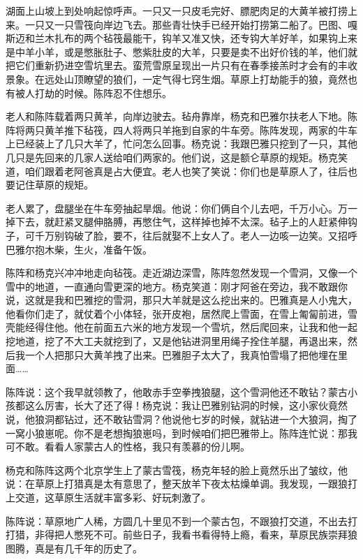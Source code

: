 \par 湖面上山坡上到处响起惊呼声。一只又一只皮毛完好、膘肥肉足的大黄羊被打捞上来。一只又一只雪筏向岸边飞去。那些青壮快手已经开始打捞第二船了。巴图、嘎斯迈和兰木扎布的两个毡筏最能干，钩羊又准又快，还专钩大羊好羊，如果钩上来是中羊小羊，或是憋胀肚子、憋紫肚皮的大羊，只要是卖不出好价钱的羊，他们就把它们重新扔进空雪坑里去。蛮荒雪原呈现出一片只有在春季接羔时才会有的丰收景象。在远处山顶瞭望的狼们，一定气得七窍生烟。草原上打劫能手的狼，竟然也有被人打劫的时候。陈阵忍不住想乐。
\par 老人和陈阵载着两只黄羊，向岸边驶去。毡舟靠岸，杨克和巴雅尔扶老人下地。陈阵将两只黄羊推下毡筏，四人将两只羊拖到自家的牛车旁。陈阵发现，两家的牛车上已经装上了几只大羊了，忙问怎么回事。杨克说：我跟巴雅只挖到了一只，其他几只是先回来的几家人送给咱们两家的。他们说，这是额仑草原的规矩。杨克笑道，咱们跟着老阿爸真是占大便宜。老人也笑了笑说：你们也是草原人了，往后也要记住草原的规矩。
\par 老人累了，盘腿坐在牛车旁抽起旱烟。他说：你们俩自个儿去吧，千万小心。万一掉下去，就赶紧叉腿伸胳膊，再憋住气，这样掉也掉不太深。毡子上的人赶紧伸钩子，可千万别钩破了脸，要不，往后就娶不上女人了。老人一边咳一边笑。又招呼巴雅尔抱木柴，生火，准备午饭。
\par 陈阵和杨克兴冲冲地走向毡筏。走近湖边深雪，陈阵忽然发现一个雪洞，又像一个雪中的地道，一直通向雪更深的地方。杨克笑道：刚才阿爸在旁边，我不敢跟你说，这就是我和巴雅挖的雪洞，那只大羊就是这么挖出来的。巴雅真是人小鬼大，他看你们走了，就仗着个小体轻，张开皮袍，居然爬上雪面，在雪上匍匐前进，雪壳能经得住他。他在前面五六米的地方发现一个雪坑，然后爬回来，让我和他一起挖地道，挖了不大工夫就挖到了，又是他钻进洞里用绳子拴住羊腿，再退出来，然后我一个人把那只大黄羊拽了出来。巴雅胆子太大了，我真怕雪塌了把他埋在里面……
\par 陈阵说：这个我早就领教了，他敢赤手空拳拽狼腿，这个雪洞他还不敢钻？蒙古小孩都这么厉害，长大了还了得！杨克说：我让巴雅别钻洞的时候，这小家伙竟然说，他狼洞都钻过，还不敢钻雪洞？他说他七岁的时候，就钻进一个大狼洞，掏了一窝小狼崽呢。你不是老想掏狼崽吗，到时候咱们把巴雅带上。陈阵连忙说：那我可不敢。看看人家蒙古人的性格，我只有羡慕的份儿啊。
\par 杨克和陈阵这两个北京学生上了蒙古雪筏，杨克年轻的脸上竟然乐出了皱纹，他说：在草原上打猎真是太有意思了，整天放羊下夜太枯燥单调。我发现，一跟狼打上交道，这草原生活就丰富多彩、好玩刺激了。
\par 陈阵说：草原地广人稀，方圆几十里见不到一个蒙古包，不跟狼打交道，不出去打打猎，非得把人憋死不可。前些日子，我看书看得特上瘾，看来，草原民族崇拜狼图腾，真是有几千年的历史了。
